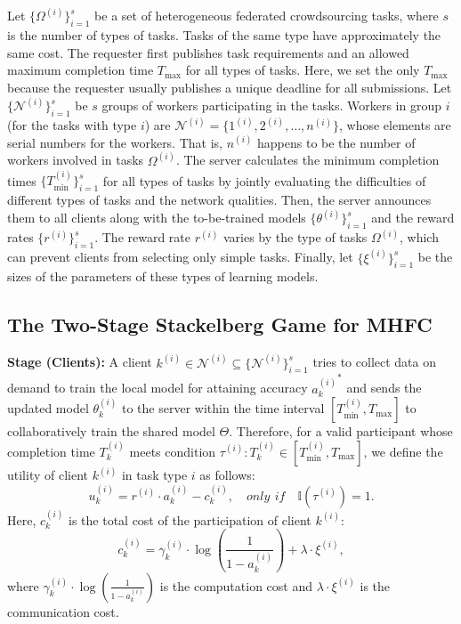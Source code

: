\documentclass[final,1p,times]{elsarticle}
\begin{document}
Let $\{\Omega^{(i)}\}_{i=1}^s$ be a set of heterogeneous federated crowdsourcing tasks, where $s$ is the number of types of tasks. Tasks of the same type have approximately the same cost. The requester first publishes task requirements and an allowed maximum completion time $T_{\max}$ for all types of tasks. Here, we set the only $T_{\max}$ because the requester usually publishes a unique deadline for all submissions. Let $\{\bm{\mathcal{N}}^{(i)}\}_{i=1}^s$ be $s$ groups of workers participating in the tasks. Workers in group $i$ (for the tasks with type $i$) are $\bm{\mathcal{N}}^{(i)} = \{1^{(i)},2^{(i)},\dots,n^{(i)}\}$, whose elements are serial numbers for the workers. That is, $n^{(i)}$ happens to be the number of workers involved in tasks $\Omega^{(i)}$. The server calculates the minimum completion times $\{T_{\min}^{(i)}\}_{i=1}^s$ for all types of tasks by jointly evaluating the difficulties of different types of tasks and the network qualities. Then, the server announces them to all clients along with the to-be-trained models $\{\theta^{(i)}\}_{i=1}^s$ and the reward rates $\{r^{(i)}\}_{i=1}^s$. The reward rate $r^{(i)}$ varies by the type of tasks $\Omega^{(i)}$, which can prevent clients from selecting only simple tasks. Finally, let $\{\xi^{(i)}\}_{i=1}^s$ be the sizes of the parameters of these types of learning models.

\subsection{The Two-Stage Stackelberg Game for MHFC}
\textbf{Stage \uppercase\expandafter{} (Clients):} A client $k^{(i)}\in\bm{\mathcal{N}}^{(i)}\subseteq\{\bm{\mathcal{N}}^{(i)}\}_{i=1}^s$ tries to collect data on demand to train the local model for attaining accuracy ${a_k^{(i)}}^\ast$ and sends the updated model $\theta_k^{(i)}$ to the server within the time interval $[T_{\min}^{(i)},T_{\max}]$ to collaboratively train the shared model $\Theta$. Therefore, for a valid participant whose completion time $T_k^{(i)}$ meets condition $\tau^{(i)}:T_k^{(i)}\in[T_{\min}^{(i)},T_{\max}]$, we define the utility of client $k^{(i)}$ in task type $i$ as follows:
\begin{equation}
	u_k^{(i)} = r^{(i)}\cdot a_k^{(i)} - c_k^{(i)}, \quad only\,\: if\quad\mathbb{I}(\tau^{(i)}) = 1.
\end{equation}
Here, $c_k^{(i)}$ is the total cost of the participation of client $k^{(i)}$:
\begin{equation}
	c_k^{(i)} = \gamma_k^{(i)}\cdot \log(\frac{1}{1-a_k^{(i)}})+\lambda\cdot\xi^{(i)},
\end{equation}
where $\gamma_k^{(i)}\cdot \log(\frac{1}{1-a_k^{(i)}})$ is the computation cost and $\lambda\cdot\xi^{(i)}$ is the communication cost.
\end{document}
